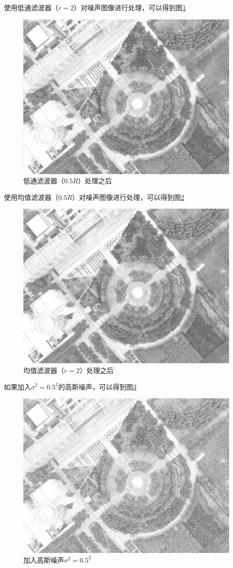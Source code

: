 使用低通滤波器（$r=2$）对噪声图像进行处理，可以得到图\ref{fig:dji0027processedbylp}
\begin{figure}[H]
	\centering
	\includegraphics[width=0.7\linewidth]{figure/DJI_0027_Processed_by_LP}
	\caption{低通滤波器（$0.5R$）处理之后}
	\label{fig:dji0027processedbylp}
\end{figure}
使用均值滤波器（$0.5R$）对噪声图像进行处理，可以得到图\ref{fig:dji0027processedbymf}
\begin{figure}[H]
	\centering
	\includegraphics[width=0.7\linewidth]{figure/DJI_0027_Processed_by_MF}
	\caption{均值滤波器（$r=2$）处理之后}
	\label{fig:dji0027processedbymf}
\end{figure}
如果加入$\sigma^2=0.5^2$的高斯噪声，可以得到图\ref{fig:dji0027withnoise50}
\begin{figure}[H]
	\centering
	\includegraphics[width=0.7\linewidth]{figure/DJI_0027_With_Noise_50}
	\caption{加入高斯噪声$\sigma^2=0.5^2$}
	\label{fig:dji0027withnoise50}
\end{figure}

